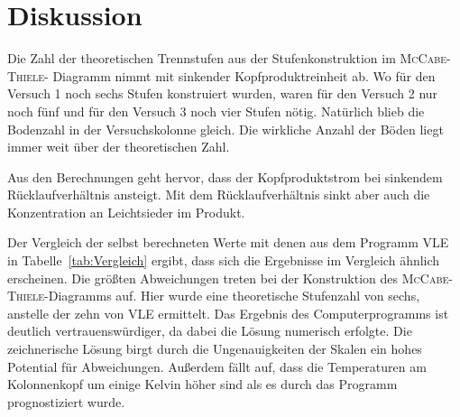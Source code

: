 \newpage
\section{Diskussion}
\label{sec:diskussion}

Die Zahl der theoretischen Trennstufen aus der Stufenkonstruktion im \mbox{\textsc{McCabe}-\textsc{Thiele}}- Diagramm nimmt mit sinkender Kopfproduktreinheit ab. Wo für den Versuch 1 noch sechs Stufen konstruiert wurden, waren für den Versuch 2 nur noch fünf und für den Versuch 3 noch vier Stufen nötig. Natürlich blieb die Bodenzahl in der Versuchskolonne gleich. Die wirkliche Anzahl der Böden liegt immer weit über der theoretischen Zahl.

Aus den Berechnungen geht hervor, dass der Kopfproduktstrom bei sinkendem Rücklaufverhältnis ansteigt. Mit dem Rücklaufverhältnis sinkt aber auch die Konzentration an Leichtsieder im Produkt.

Der Vergleich der selbst berechneten Werte mit denen aus dem Programm VLE in \mbox{Tabelle \ref{tab:Vergleich}} ergibt, dass sich die Ergebnisse im Vergleich ähnlich erscheinen. Die größten Abweichungen treten bei der Konstruktion des \textsc{McCabe}-\textsc{Thiele}-Diagramms auf. Hier wurde eine theoretische Stufenzahl von sechs, anstelle der zehn von VLE ermittelt. Das Ergebnis des Computerprogramms ist deutlich vertrauenswürdiger, da dabei die Lösung numerisch erfolgte. Die zeichnerische Lösung birgt durch die Ungenauigkeiten der Skalen ein hohes Potential für Abweichungen. Außerdem fällt auf, dass die Temperaturen am Kolonnenkopf um einige Kelvin höher sind als es durch das Programm prognostiziert wurde.

